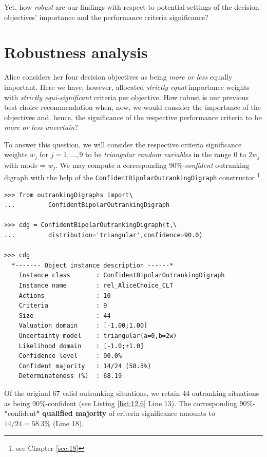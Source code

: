 Yet, how \emph{robust} are our findings with respect to potential settings of the decision objectives' importance and the performance criteria significance?
		
\section{Robustness analysis}
\label{sec:12.4}

Alice considers her four decision objectives as being \emph{more or less} equally important. Here we have, however, allocated \emph{strictly equal} importance weights with \emph{strictly equi-significant} criteria per objective. How robust is our previous best choice recommendation when, now, we would consider the importance of the objectives and, hence, the significance of the respective performance criteria to be \emph{more or less uncertain}?

To answer this question, we will consider the respective criteria significance weights $w_j$ for $j=1,...,9$ to be \emph{triangular random variables} in the range 0 to $2w_j$ with mode = $w_j$. We may compute a corresponding $90\%$-\emph{confident} outranking digraph with the help of the \texttt{ConfidentBipolarOutrankingDigraph} constructor \footnote{see Chapter \ref{sec:18}}.

\begin{lstlisting}[caption={Computing the 90\% confident outranking digraph},label=list:12.6]
>>> from outrankingDigraphs import\
...         ConfidentBipolarOutrankingDigraph

>>> cdg = ConfidentBipolarOutrankingDigraph(t,\
...         distribution='triangular',confidence=90.0)

>>> cdg
  *------- Object instance description ------*
    Instance class       : ConfidentBipolarOutrankingDigraph
    Instance name        : rel_AliceChoice_CLT
    Actions              : 10
    Criteria             : 9
    Size                 : 44
    Valuation domain     : [-1.00;1.00]
    Uncertainty model    : triangular(a=0,b=2w) 
    Likelihood domain    : [-1.0;+1.0] 
    Confidence level     : 90.0% 
    Confident majority   : 14/24 (58.3%) 
    Determinateness (%)  : 68.19
\end{lstlisting}

Of the original 67 valid outranking situations, we retain 44 outranking situations as being 90\%-confident (see Listing \ref{list:12.6} Line 13). The corresponding 90\%-*confident* \textbf{qualified majority} of criteria significance amounts to $14/24 = 58.3\%$ (Line 18).  

